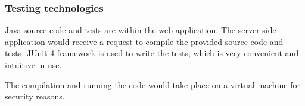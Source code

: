 \subsubsection{Testing technologies}
Java source code and tests are within the web application. The server side application would receive a request to compile the provided source code and tests. JUnit 4 framework is used to write the tests, which is very convenient and intuitive in use. 

The compilation and running the code would take place on a virtual machine for security reasons.